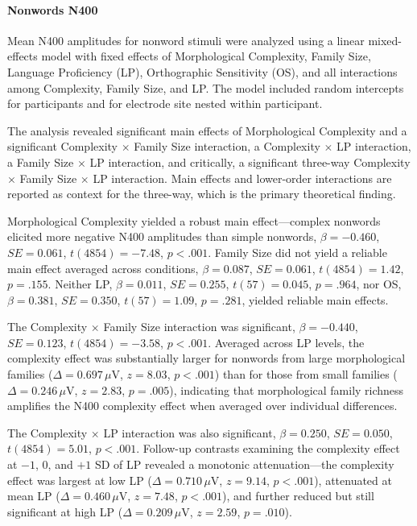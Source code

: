 \documentclass[utf8]{FrontiersinHarvard} %
\begin{document}
\paragraph*{Nonwords N400}
Mean N400 amplitudes for nonword stimuli were analyzed using a linear mixed-effects model with fixed effects of Morphological Complexity, Family Size, Language Proficiency (LP), Orthographic Sensitivity (OS), and all interactions among Complexity, Family Size, and LP. The model included random intercepts for participants and for electrode site nested within participant.

The analysis revealed significant main effects of Morphological Complexity and a significant Complexity $\times$ Family Size interaction, a Complexity $\times$ LP interaction, a Family Size $\times$ LP interaction, and critically, a significant three-way Complexity $\times$ Family Size $\times$ LP interaction. Main effects and lower-order interactions are reported as context for the three-way, which is the primary theoretical finding.

Morphological Complexity yielded a robust main effect—complex nonwords elicited more negative N400 amplitudes than simple nonwords, $\beta = -0.460$, $SE = 0.061$, $t(4854) = -7.48$, $p < .001$. Family Size did not yield a reliable main effect averaged across conditions, $\beta = 0.087$, $SE = 0.061$, $t(4854) = 1.42$, $p = .155$. Neither LP, $\beta = 0.011$, $SE = 0.255$, $t(57) = 0.045$, $p = .964$, nor OS, $\beta = 0.381$, $SE = 0.350$, $t(57) = 1.09$, $p = .281$, yielded reliable main effects.

The Complexity $\times$ Family Size interaction was significant, $\beta = -0.440$, $SE = 0.123$, $t(4854) = -3.58$, $p < .001$. Averaged across LP levels, the complexity effect was substantially larger for nonwords from large morphological families ($\Delta = 0.697\,\mu$V, $z = 8.03$, $p < .001$) than for those from small families ($\Delta = 0.246\,\mu$V, $z = 2.83$, $p = .005$), indicating that morphological family richness amplifies the N400 complexity effect when averaged over individual differences.

The Complexity $\times$ LP interaction was also significant, $\beta = 0.250$, $SE = 0.050$, $t(4854) = 5.01$, $p < .001$. Follow-up contrasts examining the complexity effect at $-1$, $0$, and $+1$ SD of LP revealed a monotonic attenuation—the complexity effect was largest at low LP ($\Delta = 0.710\,\mu$V, $z = 9.14$, $p < .001$), attenuated at mean LP ($\Delta = 0.460\,\mu$V, $z = 7.48$, $p < .001$), and further reduced but still significant at high LP ($\Delta = 0.209\,\mu$V, $z = 2.59$, $p = .010$).
\end{document}
